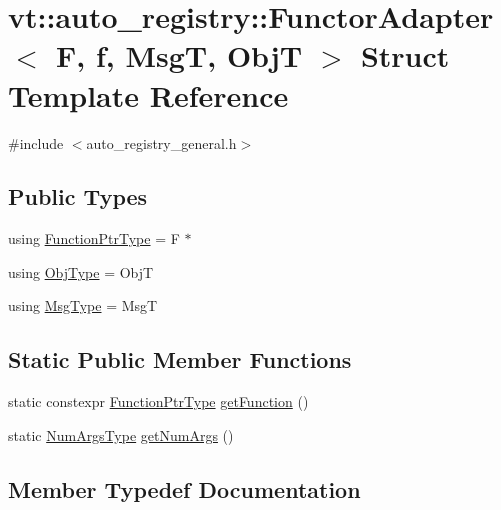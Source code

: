 \hypertarget{structvt_1_1auto__registry_1_1_functor_adapter}{}\section{vt\+:\+:auto\+\_\+registry\+:\+:Functor\+Adapter$<$ F, f, MsgT, ObjT $>$ Struct Template Reference}
\label{structvt_1_1auto__registry_1_1_functor_adapter}


{\ttfamily \#include $<$auto\+\_\+registry\+\_\+general.\+h$>$}

\subsection*{Public Types}
\begin{DoxyCompactItemize}
\item 
using \hyperlink{structvt_1_1auto__registry_1_1_functor_adapter_a8d0182e89f1d807d0221826428285a49}{Function\+Ptr\+Type} = F $\ast$
\item 
using \hyperlink{structvt_1_1auto__registry_1_1_functor_adapter_a7e152aa351c7ce3c7eba67ac07bfbcb4}{Obj\+Type} = ObjT
\item 
using \hyperlink{structvt_1_1auto__registry_1_1_functor_adapter_a3f2d51bee96f70e8370e1892194dc599}{Msg\+Type} = MsgT
\end{DoxyCompactItemize}
\subsection*{Static Public Member Functions}
\begin{DoxyCompactItemize}
\item 
static constexpr \hyperlink{structvt_1_1auto__registry_1_1_functor_adapter_a8d0182e89f1d807d0221826428285a49}{Function\+Ptr\+Type} \hyperlink{structvt_1_1auto__registry_1_1_functor_adapter_ab9c55cf5835e703ff4aef8054ef068f2}{get\+Function} ()
\item 
static \hyperlink{namespacevt_1_1auto__registry_aebda1d9d765bc9147dc654ad0712c936}{Num\+Args\+Type} \hyperlink{structvt_1_1auto__registry_1_1_functor_adapter_a0c7f5117f097c8922a9785bc84850b74}{get\+Num\+Args} ()
\end{DoxyCompactItemize}


\subsection{Member Typedef Documentation}
\mbox{\label{structvt_1_1auto__registry_1_1_functor_adapter_a8d0182e89f1d807d0221826428285a49}} 
